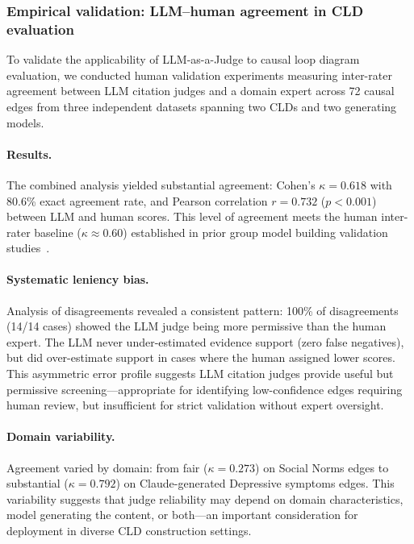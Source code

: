 \subsubsection{Empirical validation: LLM--human agreement in CLD evaluation}
\label{sec:discussion_judge_human_agreement}

To validate the applicability of LLM-as-a-Judge to causal loop diagram evaluation, we conducted human validation experiments measuring inter-rater agreement between LLM citation judges and a domain expert across 72 causal edges from three independent datasets spanning two CLDs and two generating models.

\paragraph{Results.} The combined analysis yielded substantial agreement: Cohen's $\kappa = 0.618$ with 80.6\% exact agreement rate, and Pearson correlation $r = 0.732$ ($p < 0.001$) between LLM and human scores. This level of agreement meets the human inter-rater baseline ($\kappa \approx 0.60$) established in prior group model building validation studies~\citep{landis1977measurement}.

\paragraph{Systematic leniency bias.} Analysis of disagreements revealed a consistent pattern: 100\% of disagreements (14/14 cases) showed the LLM judge being more permissive than the human expert. The LLM never under-estimated evidence support (zero false negatives), but did over-estimate support in cases where the human assigned lower scores. This asymmetric error profile suggests LLM citation judges provide useful but permissive screening---appropriate for identifying low-confidence edges requiring human review, but insufficient for strict validation without expert oversight.

\paragraph{Domain variability.} Agreement varied by domain: from fair ($\kappa = 0.273$) on Social Norms edges to substantial ($\kappa = 0.792$) on Claude-generated Depressive symptoms edges. This variability suggests that judge reliability may depend on domain characteristics, model generating the content, or both---an important consideration for deployment in diverse CLD construction settings.

